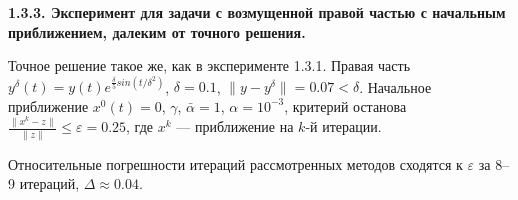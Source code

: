 {\bfseries 1.3.3. Эксперимент для задачи с возмущенной правой частью с начальным приближением, далеким от точного решения.} 

Точное решение такое же, как в эксперименте 1.3.1. Правая часть $y^\delta(t)=y(t)e^{\frac{\delta}{5} sin(t/{\delta}^2)}$, $\delta=0.1$, $\|y-y^{\delta}\|=0.07<\delta$. Начальное приближение $x^0(t)=0$, $\gamma$, $\bar\alpha=1$, $\alpha=10^{-3}$, критерий останова $\frac{\|x^k-z\|}{\|z\|}\le\varepsilon=0.25$, где $x^k$ --- приближение на $k$-й итерации. 

Относительные погрешности итераций рассмотренных методов сходятся к $\varepsilon$ за 8--9 итераций, $\Delta\approx 0.04$.

